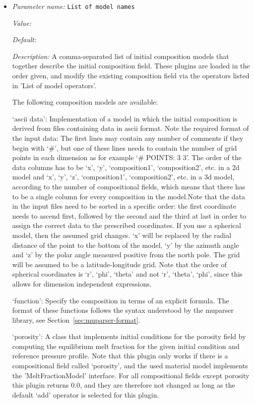 \begin{itemize}
\item {\it Parameter name:} {\tt List of model names}
\label{parameters:Initial composition model/List of model names}
\label{parameters:Initial_20composition_20model/List_20of_20model_20names}


{\it Value:} 


{\it Default:} 


{\it Description:} A comma-separated list of initial composition models that together describe the initial composition field. These plugins are loaded in the order given, and modify the existing composition field via the operators listed in 'List of model operators'.

The following composition models are available:

`ascii data': Implementation of a model in which the initial composition is derived from files containing data in ascii format. Note the required format of the input data: The first lines may contain any number of comments if they begin with `#', but one of these lines needs to contain the number of grid points in each dimension as for example `# POINTS: 3 3'. The order of the data columns has to be `x', `y', `composition1', `composition2', etc. in a 2d model and `x', `y', `z', `composition1', `composition2', etc. in a 3d model, according to the number of compositional fields, which means that there has to be a single column for every composition in the model.Note that the data in the input files need to be sorted in a specific order: the first coordinate needs to ascend first, followed by the second and the third at last in order to assign the correct data to the prescribed coordinates. If you use a spherical model, then the assumed grid changes. `x' will be replaced by the radial distance of the point to the bottom of the model, `y' by the azimuth angle and `z' by the polar angle measured positive from the north pole. The grid will be assumed to be a latitude-longitude grid. Note that the order of spherical coordinates is `r', `phi', `theta' and not `r', `theta', `phi', since this allows for dimension independent expressions.

`function': Specify the composition in terms of an explicit formula. The format of these functions follows the syntax understood by the muparser library, see Section~\ref{sec:muparser-format}.

`porosity': A class that implements initial conditions for the porosity field by computing the equilibrium melt fraction for the given initial condition and reference pressure profile. Note that this plugin only works if there is a compositional field called `porosity', and the used material model implements the 'MeltFractionModel' interface. For all compositional fields except porosity this plugin returns 0.0, and they are therefore not changed as long as the default `add' operator is selected for this plugin.



\end{itemize}
